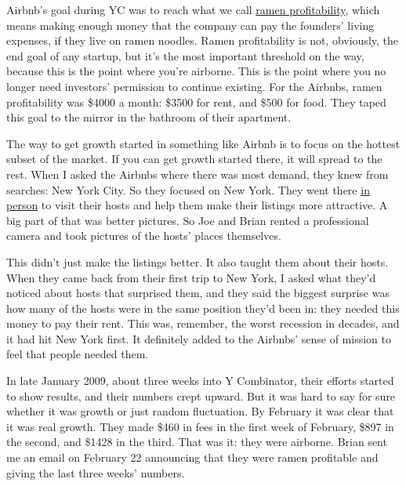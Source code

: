 Airbnb's goal
                  during YC was to reach what we call
                  \href{http://paulgraham.com/ramenprofitable.html}{ramen profitability}, which means making enough money that the company can pay
                  the founders' living expenses, if they live on ramen noodles.
                  Ramen profitability is not, obviously, the end goal of any
                  startup, but it's the most important threshold on the way,
                  because this is the point where you're airborne. This is the
                  point where you no longer need investors' permission to
                  continue existing. For the Airbnbs, ramen profitability was
                  \$4000 a month: \$3500 for rent, and \$500 for food. They taped
                  this goal to the mirror in the bathroom of their apartment.

The
                  way to get growth started in something like Airbnb is to focus
                  on the hottest subset of the market. If you can get growth
                  started there, it will spread to the rest. When I asked the
                  Airbnbs where there was most demand, they knew from searches:
                  New York City. So they focused on New York. They went there
                  \href{http://paulgraham.com/ds.html}{in person} to visit
                  their hosts and help them make their listings more attractive.
                  A big part of that was better pictures. So Joe and Brian
                  rented a professional camera and took pictures of the hosts'
                  places themselves.

This didn't just make the
                  listings better. It also taught them about their hosts. When
                  they came back from their first trip to New York, I asked what
                  they'd noticed about hosts that surprised them, and they said
                  the biggest surprise was how many of the hosts were in the
                  same position they'd been in: they needed this money to pay
                  their rent. This was, remember, the worst recession in
                  decades, and it had hit New York first. It definitely added to
                  the Airbnbs' sense of mission to feel that people needed
                  them.

In late January 2009, about three weeks into
                  Y Combinator, their efforts started to show results, and their
                  numbers crept upward. But it was hard to say for sure whether
                  it was growth or just random fluctuation. By February it was
                  clear that it was real growth. They made \$460 in fees in the
                  first week of February, \$897 in the second, and \$1428 in the
                  third. That was it: they were airborne. Brian sent me an email
                  on February 22 announcing that they were ramen profitable and
                  giving the last three weeks' numbers.

